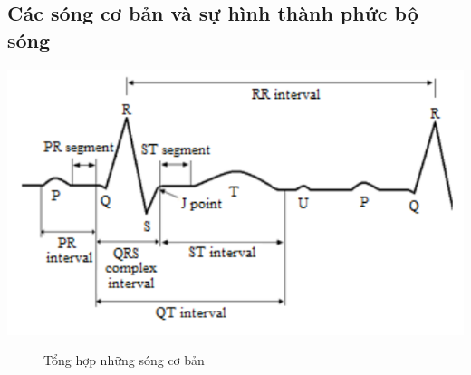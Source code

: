 \subsection{Các sóng cơ bản và sự hình thành phức bộ sóng}
\begin{center}
        \includegraphics[scale=.4]{image/week1/h32.png}
        \begin{figure}[htp]
        \begin{center}
        \end{center}
        \caption{Tổng hợp những sóng cơ bản}
        \end{figure}
    \end{center}
